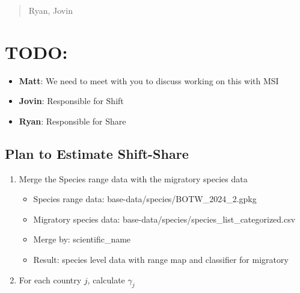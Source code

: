 \documentclass[
  letterpaper,
]{article}
\providecommand{\tightlist}{%
  \setlength{\itemsep}{0pt}\setlength{\parskip}{0pt}}\usepackage{longtable,booktabs,array}
\begin{document}
\begin{tcolorbox}[enhanced jigsaw, coltitle=black, left=2mm, arc=.35mm, bottomtitle=1mm, opacitybacktitle=0.6, leftrule=.75mm, opacityback=0, colback=white, toprule=.15mm, breakable, titlerule=0mm, colframe=quarto-callout-note-color-frame, colbacktitle=quarto-callout-note-color!10!white, title=\textcolor{quarto-callout-note-color}{\faInfo}\hspace{0.5em}{8/27/2025}, toptitle=1mm, rightrule=.15mm, bottomrule=.15mm]

\begin{quote}
Ryan, Jovin
\end{quote}

\section{TODO:}\label{todo}

\begin{itemize}
\tightlist
\item
  \textbf{Matt}: We need to meet with you to discuss working on this
  with MSI
\item
  \textbf{Jovin}: Responsible for Shift
\item
  \textbf{Ryan}: Responsible for Share
\end{itemize}

\subsection{Plan to Estimate
Shift-Share}\label{plan-to-estimate-shift-share}

\begin{enumerate}
\def\labelenumi{\arabic{enumi}.}
\tightlist
\item
  Merge the Species range data with the migratory species data

  \begin{itemize}
  \tightlist
  \item
    Species range data: base-data/species/BOTW\_2024\_2.gpkg
  \item
    Migratory species data:
    base-data/species/species\_list\_categorized.csv
  \item
    Merge by: scientific\_name
  \item
    Result: species level data with range map and classifier for
    migratory
  \end{itemize}
\item
  For each country \(j\), calculate \(\gamma_j\)
\end{enumerate}


\end{tcolorbox}
\end{document}
